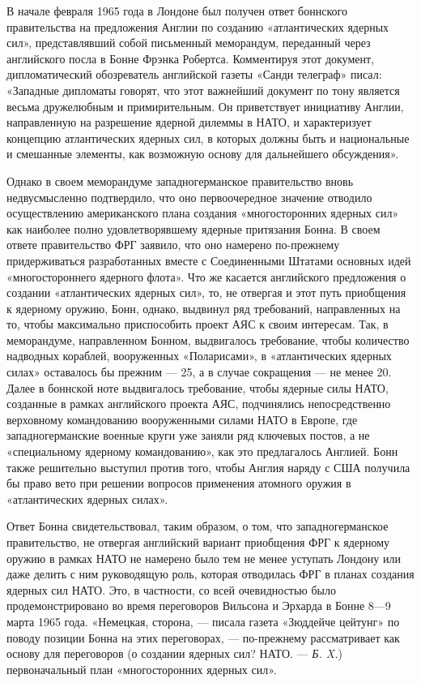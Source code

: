 \documentclass[12pt, a4paper, openany]{book}
\begin{document}
		
		В начале февраля 1965 года в Лондоне был получен ответ боннского правительства на предложения Англии по созданию «атлантических ядерных сил», представлявший собой письменный меморандум, переданный через английского посла в Бонне Фрэнка Робертса. Комментируя этот документ, дипломатический обозреватель английской газеты «Санди телеграф» писал: «Западные дипломаты говорят, что этот важнейший документ по тону является весьма дружелюбным и примирительным. Он приветствует инициативу Англии, направленную на разрешение ядерной дилеммы в НАТО, и характеризует концепцию атлантических ядерных сил, в которых должны быть и национальные и смешанные элементы, как возможную основу для дальнейшего обсуждения».
		
		Однако в своем меморандуме западногерманское правительство вновь недвусмысленно подтвердило, что оно первоочередное значение отводило осуществлению американского плана создания «многосторонних ядерных сил» как наиболее полно удовлетворявшему ядерные притязания Бонна. В своем ответе правительство ФРГ заявило, что оно намерено по-прежнему придерживаться разработанных вместе с Соединенными Штатами основных идей «многостороннего ядерного флота». Что же касается английского предложения о создании «атлантических ядерных сил», то, не отвергая и этот путь приобщения к ядерному оружию, Бонн, однако, выдвинул ряд требований, направленных на то, чтобы максимально приспособить проект АЯС к своим интересам. Так, в меморандуме, направленном Бонном, выдвигалось требование, чтобы количество надводных кораблей, вооруженных «Поларисами», в «атлантических ядерных силах» оставалось бы прежним — 25, а в случае сокращения — не менее 20. Далее в боннской ноте выдвигалось требование, чтобы ядерные силы НАТО, созданные в рамках английского проекта АЯС, подчинялись непосредственно верховному командованию вооруженными силами НАТО в Европе, где западногерманские военные круги уже заняли ряд ключевых постов, а не «специальному ядерному командованию», как это предлагалось Англией. Бонн также решительно выступил против того, чтобы Англия наряду с США получила бы право вето при решении вопросов применения атомного оружия в «атлантических ядерных силах».
		
		Ответ Бонна свидетельствовал, таким образом, о том, что западногерманское правительство, не отвергая английский вариант приобщения ФРГ к ядерному оружию в рамках НАТО не намерено было тем не менее уступать Лондону или даже делить с ним руководящую роль, которая отводилась ФРГ в планах создания ядерных сил НАТО. Это, в частности, со всей очевидностью было продемонстрировано во время переговоров Вильсона и Эрхарда в Бонне 8—9 марта 1965 года. «Немецкая, сторона, — писала газета «Зюддейче цейтунг» по поводу позиции Бонна на этих переговорах, — по-прежнему рассматривает как основу для переговоров (о создании ядерных сил? НАТО. — \textit{Б. X.}) первоначальный план «многосторонних ядерных сил».
		
\end{document}
